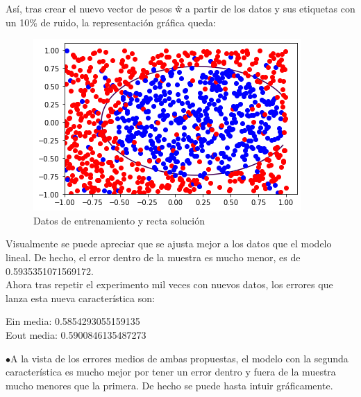 \documentclass[12pt]{article}
\begin{document}
Así, tras crear el nuevo vector de pesos ŵ a partir de los datos y sus etiquetas con un 10$\%$ de ruido, la representación gráfica queda:
\begin{figure}[H]
\centering
\includegraphics[scale=0.65]{Images/1000NFin.png} 
\caption{Datos de entrenamiento y recta solución}
\label{etiqueta}
\end{figure}
Visualmente se puede apreciar que se ajusta mejor a los datos que el modelo lineal. De hecho, el error dentro de la muestra es mucho menor, es de 0.5935351071569172.\\
Ahora tras repetir el experimento mil veces con nuevos datos, los errores que lanza esta nueva característica son:\\
\begin{center}
Ein media:  0.5854293055159135\\
Eout media:  0.5900846135487273
\end{center}
$\bullet$A la vista de los errores medios de ambas propuestas, el modelo con la segunda característica es mucho mejor por tener un error dentro y fuera de la muestra mucho menores que la primera. De hecho se puede hasta intuir gráficamente.
\end{document}
